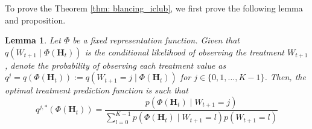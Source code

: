 \documentclass{article}
\theoremstyle{plain}
\newtheorem{lemma}[theorem]{Lemma}
\theoremstyle{definition}
\theoremstyle{remark}
\begin{document}
To prove the Theorem \ref{thm: blancing_iclub}, we first prove the following lemma and proposition.
\begin{lemma}
    Let $\Phi$ be a fixed representation function. Given that $q(W_{t+1} \mid \Phi(\mathbf{H}_t)) $ is the conditional likelihood of observing the treatment $W_{t+1}$, denote the probability of observing each treatment value as $q^j=q(\Phi(\mathbf{H}_t)):= q(W_{t+1} = j \mid \Phi(\mathbf{H}_t))$ for $j \in \{0,1,\dots, K-1\}$. Then, the optimal treatment prediction function is such that 
    \begin{equation}
        q^{j, *}(\Phi(\mathbf{H}_t) ) = \frac{p(\Phi(\mathbf{H}_t)\mid W_{t+1} = j)}{\sum_{l=0}^{K-1}p(\Phi(\mathbf{H}_t)\mid W_{t+1} = l)p(W_{t+1} = l)}
    \end{equation}
    \label{lem: optimal_q}
\end{lemma}
\end{document}
